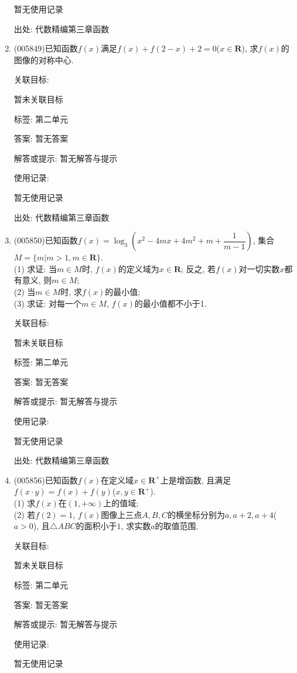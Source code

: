 \documentclass[10pt,a4paper]{article}
\begin{document}
\begin{enumerate}[1.]
暂无使用记录


出处: 代数精编第三章函数
\item { (005849)}已知函数$f(x)$满足$f(x)+f(2-x)+2=0$($x\in \mathbf{R}$), 求$f(x)$的图像的对称中心.


关联目标:

暂未关联目标



标签: 第二单元

答案: 暂无答案

解答或提示: 暂无解答与提示

使用记录:

暂无使用记录


出处: 代数精编第三章函数
\item { (005850)}已知函数$f(x)=\log_3(x^2-4mx+4m^2+m+\dfrac 1{m-1})$, 集合$M=\{m|m>1,m\in \mathbf{R}\}$.\\
(1) 求证: 当$m\in M$时, $f(x)$的定义域为$x\in \mathbf{R}$; 反之, 若$f(x)$对一切实数$x$都有意义, 则$m\in M$;\\
(2) 当$m\in M$时, 求$f(x)$的最小值;\\
(3) 求证: 对每一个$m\in M$, $f(x)$的最小值都不小于1.


关联目标:

暂未关联目标



标签: 第二单元

答案: 暂无答案

解答或提示: 暂无解答与提示

使用记录:

暂无使用记录


出处: 代数精编第三章函数
\item { (005856)}已知函数$f(x)$在定义域$x\in \mathbf{R}^+$上是增函数, 且满足$f(x\cdot y)=f(x)+f(y)$($x,y\in \mathbf{R}^+$).\\
(1) 求$f(x)$在$(1,+\infty)$上的值域;\\
(2) 若$f(2)=1$, $f(x)$图像上三点$A,B,C$的横坐标分别为$a,a+2,a+4$($a>0$), 且$\triangle ABC$的面积小于$1$, 求实数$a$的取值范围.


关联目标:

暂未关联目标



标签: 第二单元

答案: 暂无答案

解答或提示: 暂无解答与提示

使用记录:

暂无使用记录



\end{enumerate}
\end{document}
